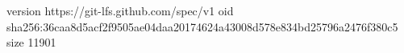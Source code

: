 version https://git-lfs.github.com/spec/v1
oid sha256:36caa8d5acf2f9505ae04daa20174624a43008d578e834bd25796a2476f380c5
size 11901

